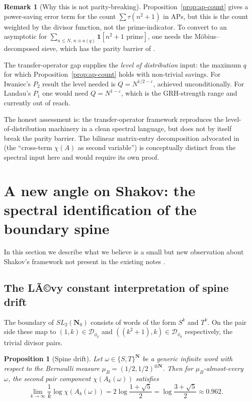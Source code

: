 ﻿\documentclass[11pt]{article}
\newtheorem{proposition}[theorem]{Proposition}
\theoremstyle{definition}
\newtheorem{remark}[theorem]{Remark}
\newcommand{\N}{\mathbf{N}}
\newcommand{\Nz}{\mathbf{N}_0}
\newcommand{\SLNz}{SL_2(\Nz)}
\newcommand{\Dphi}{\mathcal{D}_{\phi_0}}
\newcommand{\chiA}{\chi}
\begin{document}
\begin{remark}[Why this is not parity-breaking]
Proposition~\ref{prop:ap-count} gives a power-saving error term for the count $\sum\tau(n^2+1)$ in APs, but this is the count weighted by the divisor function, not the prime-indicator. To convert to an asymptotic for $\sum_{n\le N,\,n\equiv a(q)}\mathbf{1}[n^2+1\text{ prime}]$, one needs the M\"obius--decomposed sieve, which has the parity barrier of \cite{selberg-parity,iwaniec-kowalski}.

The transfer-operator gap supplies the \emph{level of distribution} input: the maximum $q$ for which Proposition~\ref{prop:ap-count} holds with non-trivial savings. For Iwaniec's $P_2$ result the level needed is $Q=N^{1/2-\varepsilon}$, achieved unconditionally. For Landau's $P_1$ one would need $Q=N^{1-\varepsilon}$, which is the GRH-strength range and currently out of reach.

The honest assessment is: the transfer-operator framework reproduces the level-of-distribution machinery in a clean spectral language, but does not by itself break the parity barrier. The bilinear matrix-entry decomposition advocated in \cite[B7]{shakovnotes} (the ``cross-term $\chiA(A)$ as second variable'') is conceptually distinct from the spectral input here and would require its own proof.
\end{remark}

\section{A new angle on Shakov: the spectral identification of the boundary spine}\label{sec:new-angle}

In this section we describe what we believe is a small but new observation about Shakov's framework not present in the existing notes \cite{shakovnotes,shakov2024}.

\subsection{The LÃ©vy constant interpretation of spine drift}

The boundary of $\SLNz$ consists of words of the form $S^k$ and $T^k$. On the pair side these map to $(1,k)\in\Dphi$ and $((k^2+1),k)\in\Dphi$ respectively, the trivial divisor pairs.

\begin{proposition}[Spine drift]\label{prop:spine-drift}
Let $\omega\in\{S,T\}^\N$ be a generic infinite word with respect to the Bernoulli measure $\mu_B=(1/2,1/2)^{\otimes\N}$. Then for $\mu_B$-almost-every $\omega$, the second pair component $\chiA(A_k(\omega))$ satisfies
\[
\lim_{k\to\infty}\frac{1}{k}\log\chiA(A_k(\omega)) = 2\log\frac{1+\sqrt{5}}{2} = \log\frac{3+\sqrt{5}}{2} \approx 0.962.
\]
\end{proposition}
\end{document}

